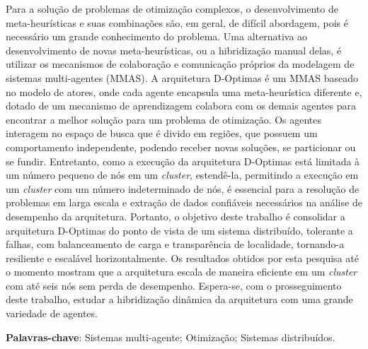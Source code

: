 


\begin{resumo}
Para a solução de problemas de otimização complexos, o desenvolvimento de meta-heurísticas e suas combinações são, em geral, de  difícil abordagem, pois é necessário um grande conhecimento do problema. Uma alternativa ao desenvolvimento de novas meta-heurísticas, ou a hibridização manual delas, é utilizar os mecanismos de colaboração e comunicação próprios da modelagem de sistemas multi-agentes (MMAS). A arquitetura D-Optimas é um MMAS baseado no modelo de atores, onde cada agente encapsula uma meta-heurística diferente e, dotado de um mecanismo de aprendizagem colabora com os demais agentes para encontrar a melhor solução para um problema de otimização. Os agentes interagem no espaço de busca que é divido em regiões, que possuem um comportamento independente, podendo receber novas soluções, se particionar ou se fundir. Entretanto, como a execução da arquitetura D-Optimas está limitada à um número pequeno de nós em um \textit{cluster}, estendê-la, permitindo a execução em um \textit{cluster} com um número indeterminado de nós, é essencial para a resolução de problemas em larga escala e extração de dados confiáveis necessários na análise de desempenho da arquitetura. Portanto, o objetivo deste trabalho é consolidar a arquitetura D-Optimas do ponto de vista de um sistema distribuído, tolerante a falhas, com balanceamento de carga e transparência de localidade, tornando-a resiliente e escalável horizontalmente. Os resultados obtidos por esta pesquisa até o momento mostram que a arquitetura escala de maneira eficiente em um \textit{cluster} com até seis nós sem perda de desempenho. Espera-se, com o prosseguimento deste trabalho, estudar a hibridização dinâmica da arquitetura com uma grande variedade de agentes.

\textbf{Palavras-chave}: Sistemas multi-agente; Otimização; Sistemas distribuídos.
 

\end{resumo}


